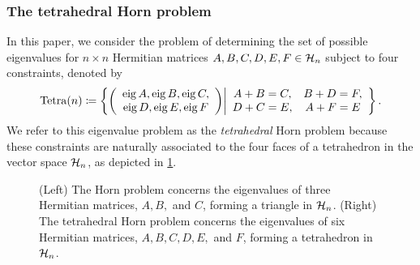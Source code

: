 \documentclass[notitlepage, 11pt, letterpaper]{amsart}
\begin{document}
\subsubsection*{The tetrahedral Horn problem}
In this paper, we consider the problem of determining the set of possible eigenvalues for $n\times n$ Hermitian matrices $A,B,C,D,E,F \in \mathcal H_{n}$ subject to four constraints, denoted by
\begin{equation}
    \label{eq:tet_cond}
    \operatorname{Tetra}(n) \coloneqq \left\{
        \bigg(
        \begin{array}{c}
            \operatorname{eig} A, \operatorname{eig} B, \operatorname{eig} C, \\
            \operatorname{eig} D, \operatorname{eig} E, \operatorname{eig} F
        \end{array}
        \bigg)
    \middle|
        \begin{array}{cc}
            A+B=C, & B+D=F, \\
            D+C=E, & A+F=E
        \end{array}
    \right\}.
\end{equation}
We refer to this eigenvalue problem as the \textit{tetrahedral} Horn problem because these constraints are naturally associated to the four faces of a tetrahedron in the vector space $\mathcal H_{n}$, as depicted in \cref{fig:tetrahedron_labelling_scheme}.
\begin{figure}[ht]
    \centering
    \caption{(Left) The Horn problem concerns the eigenvalues of three Hermitian matrices, $A,B,$ and $C$, forming a triangle in $\mathcal H_{n}$.
    (Right) The tetrahedral Horn problem concerns the eigenvalues of six Hermitian matrices, $A,B,C,D,E,$ and $F$, forming a tetrahedron in $\mathcal H_{n}$.}
    \label{fig:tetrahedron_labelling_scheme}
\end{figure}
\end{document}
